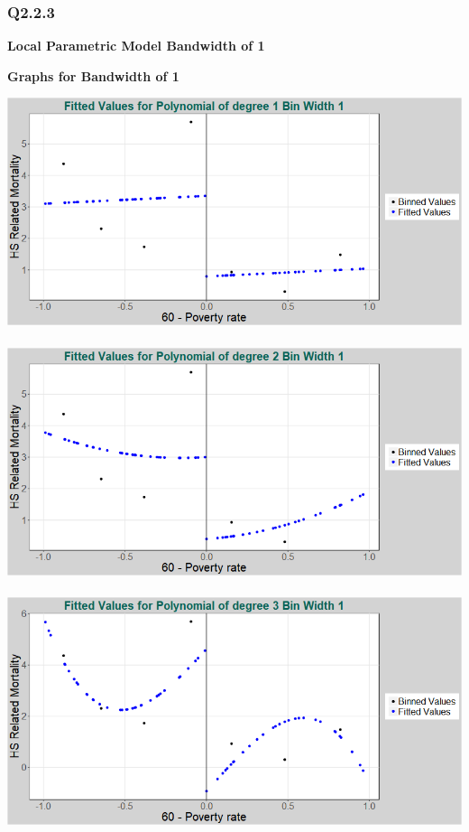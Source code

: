 \documentclass[11pt]{article}
\begin{document}
\subsubsection{Q2.2.3}

\begin{center}
	\centering
	\textbf{Local Parametric Model Bandwidth of 1 }\par\medskip
	\scalebox{1}{
		
	}
\end{center}

\begin{center}
	{\large \bf{Graphs for Bandwidth of 1}}
\end{center}

\includegraphics[width=.8\linewidth]{plot_223_poly_1_bw_1.png}
\\ \\
\includegraphics[width=.8\linewidth]{plot_223_poly_2_bw_1.png}
\\ \\
\includegraphics[width=.8\linewidth]{plot_223_poly_3_bw_1.png}
\end{document}
